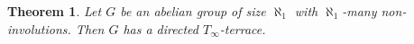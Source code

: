 \documentclass[11pt]{amsart}
\newtheorem{theorem}{Theorem}
\theoremstyle{definition}
\theoremstyle{remark}
\renewcommand{\P}{\mathbb{P}}
\renewcommand{\c}{\mathfrak{c}}
\DeclareMathOperator{\ran}{range}
\DeclareMathOperator{\dom}{dom}
\newcommand{\st}{\; | \;}
\newcommand{\set}[2]{\left\{#1\st #2 \right\}}
\newcommand{\rest}{\mathbin{\upharpoonright}}
\renewcommand{\a}{\textup{\textbf{a}}}
\renewcommand{\c}{\textup{\textbf{c}}}
\renewcommand{\d}{\textup{\textbf{d}}}
\newcommand{\e}{\textup{\textbf{e}}}
\begin{document}
\begin{theorem}
Let $G$ be an abelian group of size $\aleph_1$ with $\aleph_1$-many non-involutions. Then $G$ has a directed $T_\infty$-terrace. 
\end{theorem}
%
%	
\end{document}
